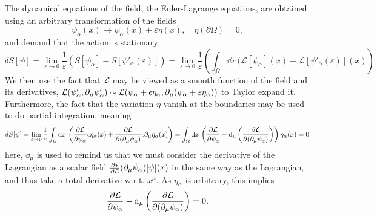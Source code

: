 The dynamical equations of the field, the Euler-Lagrange equations, are obtained using an arbitrary transformation of the fields
\begin{equation*}
    \psi_\alpha(x) \longrightarrow \psi_\alpha(x) + \varepsilon \eta(x), \quad \eta(\partial\Omega) = 0,
\end{equation*}
and demand that the action is stationary:
\begin{equation*}
    \delta S[\psi] = \lim_{\varepsilon \rightarrow 0} \frac{1}{\varepsilon} \left(S[\psi_\alpha] - S[\psi'_\alpha(\varepsilon)]\right) = \lim_{\varepsilon \rightarrow 0} \frac{1}{\varepsilon} \left(\int_\Omega \dd x \, (\mathcal{L}[\psi_\alpha](x) - \mathcal{L}[\psi'_\alpha(\varepsilon)](x)\right)
\end{equation*}
We then use the fact that $\mathcal{L}$ may be viewed as a smooth function of the field and its derivatives, $\mathcal L(\psi'_\alpha, \partial_\mu \psi'_\alpha) \sim \mathcal L(\psi_\alpha + \epsilon \eta_\alpha, \partial_\mu (\psi_\alpha + \varepsilon \eta_\alpha))$ to Taylor expand it. Furthermore, the fact that the variation $\eta$ vanish at the boundaries may be used to do partial integration, meaning
\begin{equation*}
    \delta S[\psi] = \lim_{\varepsilon \rightarrow 0} \frac{1}{\varepsilon} \int_\Omega \dd x \,\left( \pdv{\Ell}{\psi_\alpha} \epsilon \eta_\alpha(x)  + \pdv{\Ell}{(\partial_\mu\psi_\alpha)} \epsilon \partial_\mu \eta_\alpha(x)  \right) = \int_\Omega \dd x \,\left( \pdv{\Ell}{\psi_\alpha} - \dd_\mu \left(\pdv{\Ell}{(\partial_\mu\psi_\alpha)} \right)\right)\eta_\alpha(x) = 0
\end{equation*}
here, $\dd_\mu$ is used to remind us that we must consider the derivative of the Lagrangian as a scalar field $\pdv*{\Ell}{(\partial_\mu\psi_\alpha)}[\psi](x)$ in the same way as the Lagrangian, and thus take a total derivative w.r.t. $x^\mu$.
As $\eta_\alpha$ is arbitrary, this implies 
\begin{equation*}
    \pdv{\Ell}{\psi_\alpha} - \dd_\mu \left(\pdv{\Ell}{(\partial_\mu\psi_\alpha)} \right) = 0.
\end{equation*}

